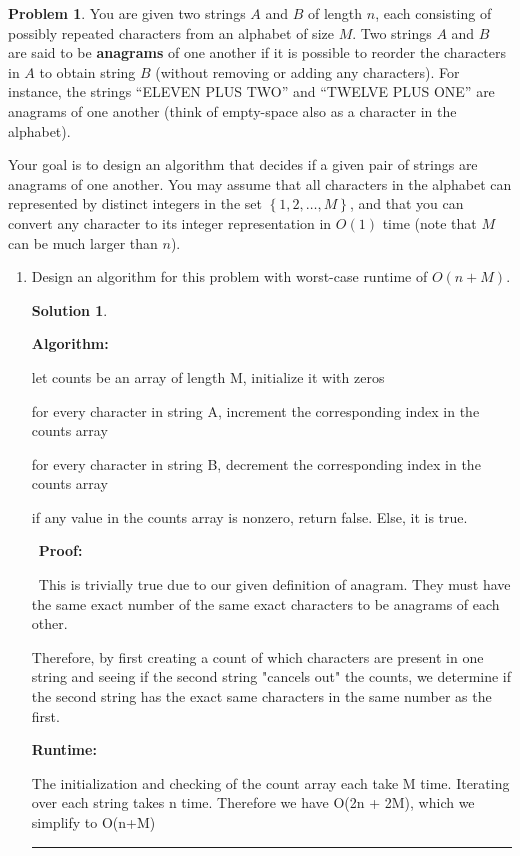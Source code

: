 \documentclass{article}
\theoremstyle{definition}
\newtheorem{problem}{Problem}
\def\fline{\rule{0.75\linewidth}{0.5pt}}
\newcommand{\finishline}{
  \begin{center}\fline
\end{center}}
\newtheorem*{solution*}{Solution}
\newenvironment{solution}{
\begin{solution*}}{{\finishline}
\end{solution*}}
\newcommand{\set}[1]{\ensuremath{\left\{ #1 \right\}}}
\begin{document}
\begin{problem}
You are given two strings $A$ and $B$ of length $n$, each consisting of possibly repeated characters from an alphabet of size $M$. Two strings $A$ and $B$ are said to be \textbf{anagrams} of one another if it is possible to reorder the characters in $A$ to obtain string $B$ (without removing or adding any characters). For instance, the strings ``ELEVEN PLUS TWO'' and ``TWELVE PLUS ONE'' are anagrams of one another (think of empty-space  also as a character in the alphabet).

\smallskip

Your goal is to design an algorithm that decides if a given pair of strings are anagrams of one another.
You may assume that all characters in the alphabet can represented by distinct integers in the set $\set{1,2,\ldots,M}$, and that you can convert any character to its integer representation in $O(1)$ time (note that $M$ can be much larger than $n$).
\smallskip

\begin{enumerate}
  \item[(a)] Design an algorithm for this problem with worst-case  runtime of $O(n+M)$.

    \begin{solution}
      \

      \textbf{Algorithm:}
      \

      let counts be an array of length M, initialize it with zeros

      for every character in string A, increment the corresponding index in the counts array

      for every character in string B, decrement the corresponding index in the counts array

      if any value in the counts array is nonzero, return false. Else, it is true.

      \
      \textbf{Proof:}

      \
      This is trivially true due to our given definition of anagram. They must have the same exact number of the same exact characters to be anagrams of each other.

      Therefore, by first creating a count of which characters are present in one string and seeing if the second string "cancels out" the counts, we determine if the second string has the exact same characters in the same number as the first.
      \

      \textbf{Runtime:}

      The initialization and checking of the count array each take M time. Iterating over each string takes n time. Therefore we have O(2n + 2M), which we simplify to O(n+M)
    \end{solution}


\end{enumerate}
\end{problem}
\end{document}
